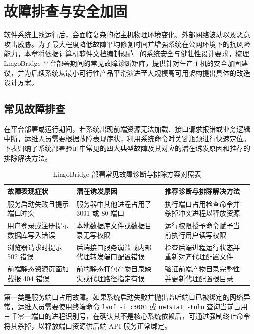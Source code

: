 \chapter{故障排查与安全加固}

软件系统上线运行后，会面临复杂的宿主机物理环境变化、外部网络波动以及恶意攻击威胁。为了最大程度降低故障平均修复时间并增强系统在公网环境下的抗风险能力，本章将依据计算机软件文档编制规范~\cite{gb8567} 的系统安全与健壮性设计要求，梳理 LingoBridge 平台部署期间的常见故障诊断矩阵，提供针对生产主机的安全加固建议，并为后续系统从最小可行性产品平滑演进至大规模高可用架构提出具体的改造设计方案。

\section{常见故障排查}

在平台部署或运行期间，若系统出现前端资源无法加载、接口请求报错或业务逻辑中断，运维人员需要根据故障表现症状，利用系统命令对关键瓶颈进行快速定位。下表归纳了系统部署验证中常见的四大典型故障及其对应的潜在诱发原因和推荐的排除解决方法。

\begin{table}[htbp]
  \centering
  \caption{LingoBridge 部署常见故障诊断与排除方案对照表}
  \label{tab:troubleshooting-matrix}
  \begin{tabularx}{\textwidth}{lXX}
    \toprule
    故障表现症状 & 潜在诱发原因 & 推荐诊断与排除解决方法 \\
    \midrule
    服务启动失败且提示端口冲突 & 服务器中其他进程占用了 \num{3001} 或 \num{80} 端口 & 执行端口占用检查命令并杀掉冲突进程以释放资源 \\
    用户登录或注册提示数据库写入错误 & 本地数据库文件或数据目录无写权限 & 运行权限授予命令赋予当前执行用户读写权限 \\
    浏览器请求时提示 502 错误 & 后端接口服务崩溃或内部代理转发端口配置错误 & 检查后端进程运行状态并重新对齐代理配置文件 \allowbreak \\
    前端静态资源页面加载报 404 错误 & 前端静态打包产物目录缺失或代理路径指定有误 & 验证前端产物目录完整性并更新代理配置根目录 \\
    \bottomrule
  \end{tabularx}
\end{table}

第一类是服务端口占用故障。如果系统启动失败并抛出监听端口已被绑定的网络异常，运维人员需要使用终端命令 \texttt{lsof -i :3001} 或 \texttt{netstat -tuln} 查询当前占用三千零一端口的进程识别号，在确认其不是核心系统依赖后，可通过强制终止命令将其杀掉，以释放端口资源供后端 API 服务正常绑定。

